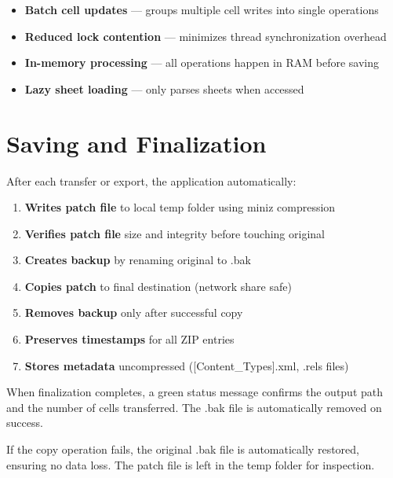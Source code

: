 \documentclass[11pt,a4paper]{article}
\begin{document}
\begin{itemize}[leftmargin=*, itemsep=4pt]
\item \textbf{Batch cell updates} — groups multiple cell writes into single operations
\item \textbf{Reduced lock contention} — minimizes thread synchronization overhead
\item \textbf{In-memory processing} — all operations happen in RAM before saving
\item \textbf{Lazy sheet loading} — only parses sheets when accessed
\end{itemize}

\section{Saving and Finalization}

After each transfer or export, the application automatically:

\begin{enumerate}[leftmargin=*, itemsep=4pt]
\item \textbf{Writes patch file} to local temp folder using miniz compression
\item \textbf{Verifies patch file} size and integrity before touching original
\item \textbf{Creates backup} by renaming original to .bak
\item \textbf{Copies patch} to final destination (network share safe)
\item \textbf{Removes backup} only after successful copy
\item \textbf{Preserves timestamps} for all ZIP entries
\item \textbf{Stores metadata} uncompressed ([Content\_Types].xml, .rels files)
\end{enumerate}

\begin{successbox}
When finalization completes, a green status message confirms the output path and the number of cells transferred. The .bak file is automatically removed on success.
\end{successbox}

\begin{infobox}
If the copy operation fails, the original .bak file is automatically restored, ensuring no data loss. The patch file is left in the temp folder for inspection.
\end{infobox}
\end{document}
